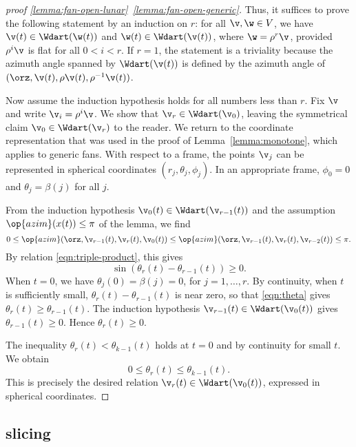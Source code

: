 \begin{proof}[proof \eqref{lemma:fan-open-lunar}~\eqref{lemma:fan-open-generic}]
Thus, it suffices to prove the following statement by an induction on
$r$: for all $\v,\w\in V$, we have $\v(t)\in \Wdart(\w(t))$ and
$\w(t)\in \Wdart(\v(t))$, where $\w=\rho^r\v$, provided $\rho^i\v$ is
flat for all $0<i<r$.  If $r=1$, the statement is a triviality because
the azimuth angle spanned by $\Wdart(\v(t))$ is defined by the azimuth
angle of $(\orz,\v(t),\rho\v(t),\rho^{-1}\v(t))$.

Now assume the induction hypothesis holds for all numbers less than
$r$.  Fix $\v$ and write $\v_i = \rho^i \v$.  We show that $\v_r\in
\Wdart(\v_0)$, leaving the symmetrical claim $\v_0\in \Wdart(\v_r)$ to
the reader.  We return to the coordinate representation that was used
in the proof of Lemma~\ref{lemma:monotone}, which applies to generic
fans.  With respect to a frame, the points $\v_j$ can be represented
in spherical coordinates $(r_j,\theta_j,\phi_j)$.  In an appropriate
frame, $\phi_0=0$ and $\theta_j=\beta(j)$ for all $j$.

From the  induction hypothesis $\v_0(t)\in \Wdart(\v_{r-1}(t))$
and the assumption $\op{azim}(x(t))\le\pi$ of the lemma, we find
\[
0\le \op{azim}(\orz,\v_{r-1}(t),\v_r(t),\v_0(t))\le
\op{azim}(\orz,\v_{r-1}(t),\v_r(t),\v_{r-2}(t))\le \pi.
\]
By relation \eqref{eqn:triple-product}, this gives
\begin{equation}\label{eqn:theta}
\sin(\theta_r(t)-\theta_{r-1}(t))\ge 0.
\end{equation}
When $t=0$, we have $\theta_j(0)=\beta(j)=0$, for $j=1,\ldots,r$.  By
continuity, when $t$ is sufficiently small,
$\theta_r(t)-\theta_{r-1}(t)$ is near zero, so that \eqref{eqn:theta}
gives $\theta_r(t)\ge \theta_{r-1}(t)$.  The induction hypothesis
$\v_{r-1}(t)\in \Wdart(\v_0(t))$ gives $\theta_{r-1}(t)\ge0$.  Hence
$\theta_r(t)\ge0$.

The inequality $\theta_r(t) < \theta_{k-1}(t)$ holds at $t=0$ and by continuity
for small $t$.  We obtain
\[
0 \le \theta_r(t) \le \theta_{k-1}(t).
\]
This is precisely the desired relation $\v_r(t)\in \Wdart(\v_0(t))$,
expressed in spherical coordinates.
\end{proof}



\subsection{slicing}




